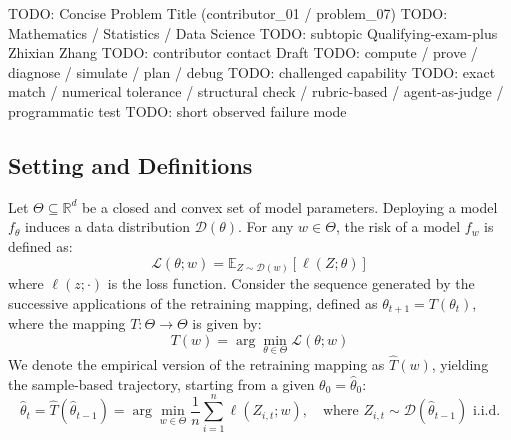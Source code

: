 \documentclass[../../../main.tex]{subfiles}
\begin{document}

\problemsetup
  {TODO: Concise Problem Title (contributor\_01 / problem\_07)}
  {TODO: Mathematics / Statistics / Data Science}
  {TODO: subtopic}
  {Qualifying-exam-plus}
  {Zhixian Zhang}
  {TODO: contributor contact}
  {Draft}
\problemtags
  {TODO: compute / prove / diagnose / simulate / plan / debug}
  {TODO: challenged capability}
  {TODO: exact match / numerical tolerance / structural check / rubric-based / agent-as-judge / programmatic test}
  {TODO: short observed failure mode}
\begin{msbproblem}

\begin{problemstatement}
\subsection*{Setting and Definitions} 
Let $\Theta \subseteq \mathbb{R}^d$ be a closed and convex set of model parameters. Deploying a model $f_\theta$ induces a data distribution $\mathcal{D}(\theta)$. For any $w \in \Theta$, the risk of a model $f_w$ is defined as:
\[
\mathcal{L}(\theta; w) = \mathbb{E}_{Z \sim \mathcal{D}(w)} [\ell(Z; \theta)]
\]
where $\ell(z; \cdot)$ is the loss function. 
Consider the sequence generated by the successive applications of the retraining mapping, defined as $\theta_{t+1} = T(\theta_t)$, where the mapping $T: \Theta \rightarrow \Theta$ is given by:
\[
T(w) = \arg\min_{\theta \in \Theta} \mathcal{L}(\theta; w)
\]
We denote the empirical version of the retraining mapping as $\hat{T}(w)$, yielding the sample-based trajectory, starting from a given $\theta_0 = \hat \theta_0$:
\[
\hat{\theta}_t = \widehat{T}(\hat{\theta}_{t-1}) = \arg\min_{w \in \Theta} \frac{1}{n} \sum_{i=1}^n \ell(Z_{i,t}; w), \quad \text{where } Z_{i,t} \sim \mathcal{D}(\hat{\theta}_{t-1}) \text{ i.i.d.}
\]


\end{problemstatement}
\end{msbproblem}
\end{document}
